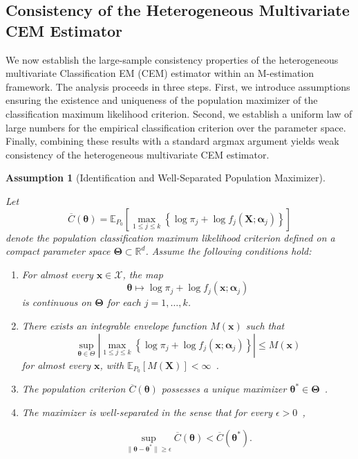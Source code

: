\documentclass[pdflatex,sn-mathphys-ay]{sn-jnl}%
\let\oldtheta\theta
\renewcommand{\theta}{\boldsymbol{\oldtheta}}
\let\oldalpha\alpha
\renewcommand{\alpha}{\boldsymbol{\oldalpha}}
\theoremstyle{thmstyleone}%
\theoremstyle{thmstyletwo}%
\theoremstyle{thmstylethree}%
\newtheorem{assumption}{Assumption}
\begin{document}
\subsection{Consistency of the Heterogeneous Multivariate CEM Estimator}
\label{subsec:consistency}

We now establish the large-sample consistency properties of the heterogeneous multivariate Classification EM (CEM) estimator within an M-estimation framework. The analysis proceeds in three steps. First, we introduce assumptions ensuring the existence and uniqueness of the population maximizer of the classification maximum likelihood criterion. Second, we establish a uniform law of large numbers for the empirical classification criterion over the parameter space. Finally, combining these results with a standard argmax argument yields weak consistency of the heterogeneous multivariate CEM estimator.

\begin{assumption}[Identification and Well-Separated Population Maximizer]
\label{ass:cml_identification}

Let
\[
    \overline{C}(\boldsymbol{\theta})
    =
    \mathbb{E}_{P_0}
    \left[
        \max_{1 \leq j \leq k}
        \left\{
            \log \pi_j
            +
            \log f_j(\mathbf{X};\boldsymbol{\alpha}_j)
        \right\}
    \right]
\]
denote the population classification maximum likelihood criterion defined on a compact parameter space $\boldsymbol{\Theta} \subset \mathbb{R}^d$. Assume the following conditions hold:

\begin{enumerate}

\item
For almost every $\mathbf{x}\in\mathcal{X}$, the map
\[
    \boldsymbol{\theta}
    \mapsto
    \log \pi_j
    +
    \log f_j(\mathbf{x};\boldsymbol{\alpha}_j)
\]
is continuous on $\boldsymbol{\Theta}$ for each $j=1,\ldots,k$.

\item
There exists an integrable envelope function $M(\mathbf{x})$ such that
\[
    \sup_{\boldsymbol{\theta}\in\Theta}
    \left|
        \max_{1 \leq j \leq k}
        \left\{
            \log \pi_j
            +
            \log f_j(\mathbf{x};\boldsymbol{\alpha}_j)
        \right\}
    \right|
    \leq
    M(\mathbf{x})
\]
for almost every $\mathbf{x}$, with
   $ \mathbb{E}_{P_0}
    \left[
        M(\mathbf{X})
    \right]
    <
    \infty$~.


\item
The population criterion $\overline{C}(\boldsymbol{\theta})$ possesses a unique maximizer
$\boldsymbol{\theta}^* \in\boldsymbol{\Theta}$~.


\item
The maximizer is well-separated in the sense that for every $\epsilon>0$~,

\[
    \sup_{
        \|\boldsymbol{\theta}-\boldsymbol{\theta}^*\|
        \geq
        \epsilon
    }
    \overline{C}(\boldsymbol{\theta})
    <
    \overline{C}(\boldsymbol{\theta}^*).
\]

\end{enumerate}

\end{assumption}
\end{document}
